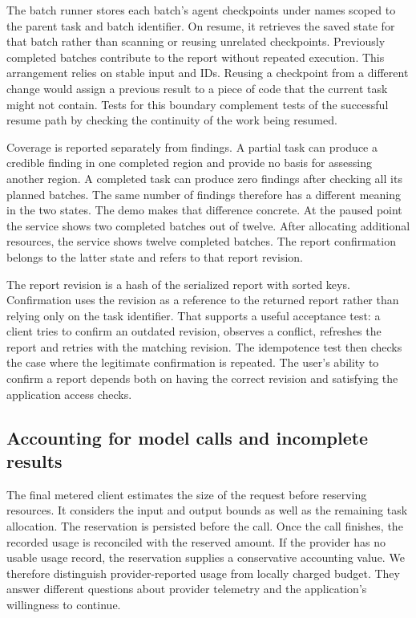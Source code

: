 \documentclass[journal,compsoc]{IEEEtran}
\begin{document}
The batch runner stores each batch's agent checkpoints under names scoped to the parent task and batch identifier. On resume, it retrieves the saved state for that batch rather than scanning or reusing unrelated checkpoints. Previously completed batches contribute to the report without repeated execution. This arrangement relies on stable input and IDs. Reusing a checkpoint from a different change would assign a previous result to a piece of code that the current task might not contain. Tests for this boundary complement tests of the successful resume path by checking the continuity of the work being resumed.

Coverage is reported separately from findings. A partial task can produce a credible finding in one completed region and provide no basis for assessing another region. A completed task can produce zero findings after checking all its planned batches. The same number of findings therefore has a different meaning in the two states. The demo makes that difference concrete. At the paused point the service shows two completed batches out of twelve. After allocating additional resources, the service shows twelve completed batches. The report confirmation belongs to the latter state and refers to that report revision.

The report revision is a hash of the serialized report with sorted keys. Confirmation uses the revision as a reference to the returned report rather than relying only on the task identifier. That supports a useful acceptance test: a client tries to confirm an outdated revision, observes a conflict, refreshes the report and retries with the matching revision. The idempotence test then checks the case where the legitimate confirmation is repeated. The user's ability to confirm a report depends both on having the correct revision and satisfying the application access checks.

\subsection{Accounting for model calls and incomplete results}
The final metered client estimates the size of the request before reserving resources. It considers the input and output bounds as well as the remaining task allocation. The reservation is persisted before the call. Once the call finishes, the recorded usage is reconciled with the reserved amount. If the provider has no usable usage record, the reservation supplies a conservative accounting value. We therefore distinguish provider-reported usage from locally charged budget. They answer different questions about provider telemetry and the application's willingness to continue.
\end{document}
